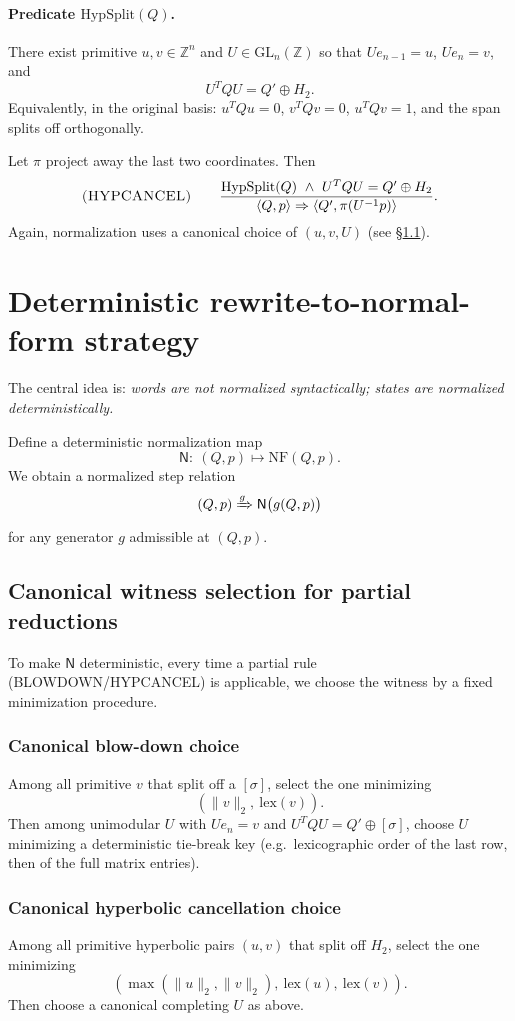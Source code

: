 \documentclass[11pt]{article}
\newcommand{\ZZ}{\mathbb{Z}}
\newcommand{\NF}{\mathrm{NF}}
\newcommand{\GL}{\mathrm{GL}}
\newcommand{\lex}{\mathrm{lex}}
\newcommand{\proj}{\pi}
\newcommand{\cfg}[2]{\langle #1,#2\rangle}
\newcommand{\Rule}[1]{\textsc{(#1)}}
\begin{document}
\paragraph{Predicate $\mathrm{HypSplit}(Q)$.}
There exist primitive $u,v\in\ZZ^n$ and $U\in \GL_n(\ZZ)$ so that $Ue_{n-1}=u$, $Ue_n=v$, and
\[
U^T Q U = Q'\oplus H_2.
\]
Equivalently, in the original basis: $u^TQu=0$, $v^TQv=0$, $u^TQv=1$, and the span splits off orthogonally.

Let $\proj$ project away the last two coordinates. Then
\[
\Rule{HYPCANCEL}\qquad
\frac{\mathrm{HypSplit}(Q)\ \wedge\ U^TQU=Q'\oplus H_2}{\cfg{Q}{p}\Rightarrow \cfg{Q'}{\proj(U^{-1}p)}}.
\]
Again, normalization uses a canonical choice of $(u,v,U)$ (see \S\ref{sec:canonwitness}).

\section{Deterministic rewrite-to-normal-form strategy}

The central idea is: \emph{words are not normalized syntactically; states are normalized deterministically.}

Define a deterministic normalization map
\[
\mathsf{N}:\ (Q,p)\longmapsto \NF(Q,p).
\]
We obtain a normalized step relation
\[
(Q,p)\xRightarrow{g}\mathsf{N}\big(g(Q,p)\big)
\]
for any generator $g$ admissible at $(Q,p)$.

\subsection{Canonical witness selection for partial reductions}\label{sec:canonwitness}
To make $\mathsf N$ deterministic, every time a partial rule (BLOWDOWN/HYPCANCEL) is applicable, we choose the witness by a fixed minimization procedure.

\subsubsection*{Canonical blow-down choice}
Among all primitive $v$ that split off a $[\sigma]$, select the one minimizing
\[
(\|v\|_2,\ \lex(v)).
\]
Then among unimodular $U$ with $Ue_n=v$ and $U^TQU=Q'\oplus[\sigma]$, choose $U$ minimizing a deterministic tie-break key (e.g.\ lexicographic order of the last row, then of the full matrix entries).

\subsubsection*{Canonical hyperbolic cancellation choice}
Among all primitive hyperbolic pairs $(u,v)$ that split off $H_2$, select the one minimizing
\[
(\max(\|u\|_2,\|v\|_2),\ \lex(u),\ \lex(v)).
\]
Then choose a canonical completing $U$ as above.
\end{document}
